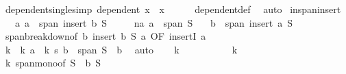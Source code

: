 \begin{isabellebody}
\ dependent{\isacharunderscore}{\kern0pt}single{\isacharbrackleft}{\kern0pt}simp{\isacharbrackright}{\kern0pt}{\isacharcolon}{\kern0pt}\ {\isachardoublequoteopen}dependent\ {\isacharbraceleft}{\kern0pt}x{\isacharbraceright}{\kern0pt}\ {\isasymlongleftrightarrow}\ x\ {\isacharequal}{\kern0pt}\ {}{\isachardoublequoteclose}\isanewline
%
\isadelimproof
\ \ %
\endisadelimproof
%
\isatagproof
{}\isamarkupfalse%
\ dependent{\isacharunderscore}{\kern0pt}def\ \isamarkupfalse%
\ auto%
\endisatagproof
{\isafoldproof}%
%
\isadelimproof
\isanewline
%
\endisadelimproof
\isanewline
{}\isamarkupfalse%
\ in{\isacharunderscore}{\kern0pt}span{\isacharunderscore}{\kern0pt}insert{\isacharcolon}{\kern0pt}\isanewline
\ \ \ a{\isacharcolon}{\kern0pt}\ {\isachardoublequoteopen}a\ {\isasymin}\ span\ {\isacharparenleft}{\kern0pt}insert\ b\ S{\isacharparenright}{\kern0pt}{\isachardoublequoteclose}\isanewline
\ \ \ \ \ na{\isacharcolon}{\kern0pt}\ {\isachardoublequoteopen}a\ {\isasymnotin}\ span\ S{\isachardoublequoteclose}\isanewline
\ \ \ {\isachardoublequoteopen}b\ {\isasymin}\ span\ {\isacharparenleft}{\kern0pt}insert\ a\ S{\isacharparenright}{\kern0pt}{\isachardoublequoteclose}\isanewline
%
\isadelimproof
%
\endisadelimproof
%
\isatagproof
{}\isamarkupfalse%
\ {\isacharminus}{\kern0pt}\isanewline
\ \ \isamarkupfalse%
\ span{\isacharunderscore}{\kern0pt}breakdown{\isacharbrackleft}{\kern0pt}of\ b\ {\isachardoublequoteopen}insert\ b\ S{\isachardoublequoteclose}\ a{\isacharcomma}{\kern0pt}\ OF\ insertI{}\ a{\isacharbrackright}{\kern0pt}\isanewline
\ \ \isamarkupfalse%
\ k\ \ k{\isacharcolon}{\kern0pt}\ {\isachardoublequoteopen}a\ {\isacharminus}{\kern0pt}\ k\ {\isacharasterisk}{\kern0pt}s\ b\ {\isasymin}\ span\ {\isacharparenleft}{\kern0pt}S\ {\isacharminus}{\kern0pt}\ {\isacharbraceleft}{\kern0pt}b{\isacharbraceright}{\kern0pt}{\isacharparenright}{\kern0pt}{\isachardoublequoteclose}\ \isamarkupfalse%
\ auto\isanewline
\ \ \isamarkupfalse%
\ {\isachardoublequoteopen}k\ {\isasymnoteq}\ {}{\isachardoublequoteclose}\isanewline
\ \ \isamarkupfalse%
\isanewline
\ \ \ \ \isamarkupfalse%
\ {\isachardoublequoteopen}k\ {\isacharequal}{\kern0pt}\ {}{\isachardoublequoteclose}\isanewline
\ \ \ \ \isamarkupfalse%
\ k\ span{\isacharunderscore}{\kern0pt}mono{\isacharbrackleft}{\kern0pt}of\ {\isachardoublequoteopen}S\ {\isacharminus}{\kern0pt}\ {\isacharbraceleft}{\kern0pt}b{\isacharbraceright}{\kern0pt}{\isachardoublequoteclose}\ S{\isacharbrackright}{\kern0pt}\ \isamarkupfalse%

\end{isabellebody}
